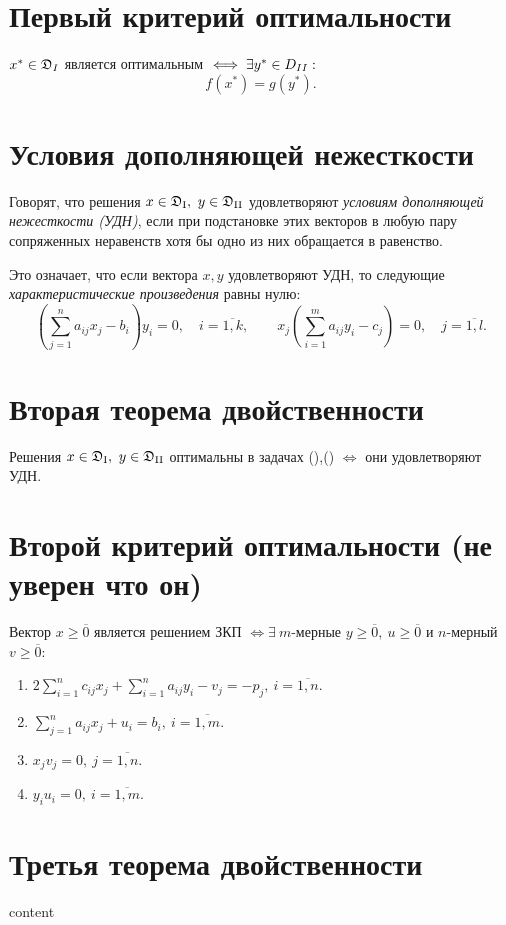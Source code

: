 \section{Первый критерий оптимальности}

\begin{corollary}
	$x^* \in \mathfrak{D}_\RomanNumeralCaps{1}$ является оптимальным $\iff \exists y^* \in D_{\RomanNumeralCaps{2}}:$
	\[
		f(x^*) = g(y^*).
	\]
\end{corollary}

\section{Условия дополняющей нежесткости}

\begin{definition}
	Говорят, что решения $ x \in \mathfrak{D}_\text{\RomanNumeralCaps{1}}, \ y \in \mathfrak{D}_\text{\RomanNumeralCaps{2}} $ удовлетворяют \emph{условиям дополняющей нежесткости (УДН)}, если при подстановке этих векторов в любую пару сопряженных неравенств хотя бы одно из них обращается в равенство.

	Это означает, что если вектора $ x,y $ удовлетворяют УДН, то следующие \emph{характеристические произведения} равны нулю:
	\[
		\left(\sum_{j=1}^{n}a_{ij}x_j - b_i\right)y_i = 0, \quad i = \overline{1,k}, \qquad x_j \left(\sum_{i=1}^{m}a_{ij}y_i - c_j\right) = 0, \quad j = \overline{1,l}.
	\]
\end{definition}

\section{Вторая теорема двойственности}

\begin{theorem}
	Решения $ x \in \mathfrak{D}_\text{\RomanNumeralCaps{1}}, \ y \in \mathfrak{D}_\text{\RomanNumeralCaps{2}} $ оптимальны в задачах (),() $ \iff $ они удовлетворяют УДН.
\end{theorem}

\section{Второй критерий оптимальности (не уверен что он)}

\begin{corollary}
	Вектор $x \geqslant \overline{0}$ является решением ЗКП $\iff \exists \ m$-мерные $y \geqslant \overline{0}, \ u \geqslant \overline{0}$ и $n$-мерный $v \geqslant \overline{0}$:
	\begin{enumerate}
		\item $2 \sum_{i=1}^{n}c_{ij}x_j + \sum_{i=1}^{n}a_{ij}y_i - v_j = -p_j, \ i = \overline{1,n}$.
		\item $\sum_{j=1}^{n}a_{ij}x_j + u_i = b_i, \ i = \overline{1,m}$.
		\item $x_jv_j = 0, \ j = \overline{1,n}$.
		\item $y_iu_i = 0, \ i = \overline{1,m}$.
	\end{enumerate}
\end{corollary}

\section{Третья теорема двойственности}

content
